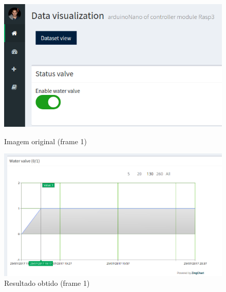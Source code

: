 \newpage


\begin{figure}[h]
	\centering
	\begin{minipage}[b]{0.495\textwidth}
		\centering
		\includegraphics[width=\textwidth]{prints-web/onstatus.png}
		\caption{Imagem original (frame 1)}
		\label{bluetth05-res}
	\end{minipage}
	\hfill
	\begin{minipage}[b]{0.495\textwidth}
		\centering
		\includegraphics[width=\textwidth]{prints-web/viewstatus.png}
		\caption{Resultado obtido (frame 1)}
		\label{comimageesquema}
	\end{minipage}
\end{figure}



